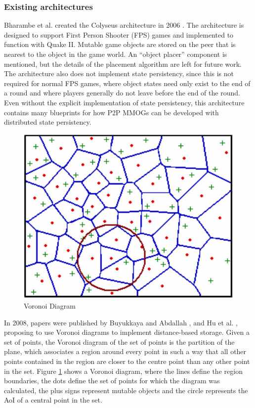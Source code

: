 \documentclass[10pt,a4paper,journal,cspaper,compsoc]{IEEEtran}
\begin{document}
\subsubsection{Existing architectures}

Bharambe et al. created the Colyseus architecture in 2006 \cite{colyseus_distance_based}. The architecture is designed to support First Person
Shooter (FPS) games and implemented to function with Quake II. Mutable game objects are stored on the peer that is nearest to the object in the game
world. An ``object placer'' component is mentioned, but the details of the placement algorithm are left for future work. The architecture also does
not implement state persistency, since this is not required for normal FPS games, where object states need only exist to the end of a round and where
players generally do not leave before the end of the round. Even without the explicit implementation of state persistency, this architecture contains
many blueprints for how P2P MMOGs can be developed with distributed state persistency.

\begin{figure}[htbp]
 \centering
 \includegraphics[width=\columnwidth]{voronoi_diagram}
 \caption{Voronoi Diagram \cite{Buyukkaya_voronoi_state_management}}
 \label{fig_voronoi_diagram}
\end{figure}
%
In 2008, papers were published by Buyukkaya and Abdallah \cite{Buyukkaya_voronoi_state_management}, and Hu et al. \cite{Hu_voronoi_IM}, proposing to
use Voronoi diagrams \cite{voronoi_diagrams_survey} to implement distance-based storage. Given a set of points, the Voronoi diagram of the set of
points is the partition of the plane, which associates a region around every point in such a way that all other points contained in the region are
closer to the centre point than any other point in the set. Figure \ref{fig_voronoi_diagram} shows a Voronoi diagram, where the lines define the
region boundaries, the dots define the set of points for which the diagram was calculated, the plus signs represent mutable objects and the circle
represents the \ac{AoI} of a central point in the set.
\end{document}
